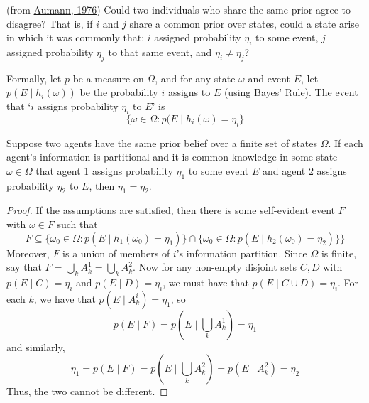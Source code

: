 \documentclass[10pt]{article}
\begin{document}
\begin{example}
	 (from \href{https://www.jstor.org/stable/2958591?seq=1}{Aumann, 1976}) Could two individuals who share the same prior agree to disagree? That is, if $i$ and $j$ share a common prior over states, could a state arise in which it was commonly that: $i$ assigned probability $\eta_i$ to some event, $j$ assigned probability $\eta_j$ to that same event, and $\eta_i \ne \eta_j$? 
	
	Formally, let $p$ be a measure on $\Omega$, and for any state $\omega$ and event $E$, let $p(E \mid h_i(\omega))$ be the probability $i$ assigns to $E$ (using Bayes' Rule). The event that `$i$ assigns probability $\eta_i$ to $E$' is\[\{\omega\in\Omega : p(E \mid h_i(\omega) = \eta_i\}\]
		
	\begin{proposition}
		Suppose two agents have the same prior belief over a finite set of states $\Omega$. If each agent's information is partitional and it is common knowledge in some state $\omega \in \Omega$ that agent 1 assigns probability $\eta_1$ to some event $E$ and agent 2 assigns probability $\eta_2$ to $E$, then $\eta_1=\eta_2$.
	\end{proposition}
	\begin{proof}
		If the assumptions are satisfied, then there is some self-evident event $F$ with $\omega \in F$ such that \[F \subseteq \{\omega_0 \in \Omega : p(E \mid h_1(\omega_0) = \eta_1)\} \cap \{\omega_0\in \Omega : p(E \mid h_2(\omega_0) = \eta_2)\}\}\] Moreover, $F$ is a union of members of $i$'s information partition. Since $\Omega$ is finite, say that $F = \bigcup_k A_k^1 =\bigcup_k A_k^2$. Now for any non-empty disjoint sets $C,D$ with $p(E \mid C) = \eta_i$ and $p(E \mid D) = \eta_i$, we must have that $p(E \mid C \cup D) = \eta_i$. For each $k$, we have that $p(E \mid A_k^i) = \eta_1$, so \[p(E \mid F) = p(E \mid \bigcup_k A_k^1) = \eta_1\]and similarly, \[\eta_1 = p(E \mid F) = p(E \mid \bigcup_k A_k^2) = p(E \mid A_k^2) = \eta_2\]Thus, the two cannot be different.
	\end{proof}
\end{example}
\end{document}
